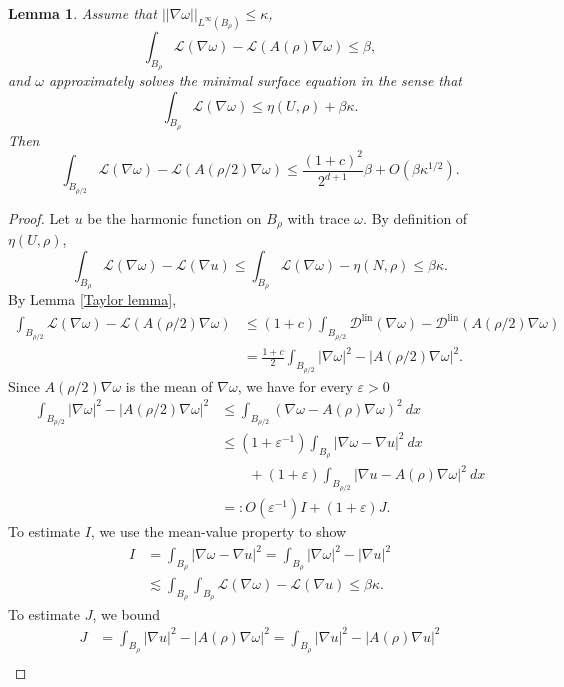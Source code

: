 \documentclass[reqno,12pt,letterpaper]{amsart}
\newcommand{\Lagrange}{\mathscr L}
\newcommand{\DirL}{\mathscr D^{\mathrm{lin}}}
\newtheorem{lemma}[theorem]{Lemma}
\theoremstyle{definition}
\numberwithin{equation}{section}
\begin{document}
\begin{lemma}
Assume that $||\nabla \omega||_{L^\infty(B_\rho)} \leq \kappa$,
$$\int_{B_\rho} \Lagrange(\nabla \omega) - \Lagrange(A(\rho)\nabla \omega) \leq \beta,$$
and $\omega$ approximately solves the minimal surface equation in the sense that
$$\int_{B_\rho} \Lagrange(\nabla \omega) \leq \eta(U, \rho) + \beta \kappa.$$
Then
$$\int_{B_{\rho/2}} \Lagrange(\nabla \omega) - \Lagrange(A(\rho/2)\nabla \omega) \leq \frac{(1 + c)^2}{2^{d + 1}}\beta + O(\beta \kappa^{1/2}).$$
\end{lemma}
\begin{proof}
Let $u$ be the harmonic function on $B_\rho$ with trace $\omega$.
By definition of $\eta(U, \rho)$,
$$\int_{B_\rho} \Lagrange(\nabla \omega) - \Lagrange(\nabla u) \leq \int_{B_\rho} \Lagrange(\nabla \omega) - \eta(N, \rho) \leq \beta\kappa.$$
By Lemma \ref{Taylor lemma},
\begin{align*}
\int_{B_{\rho/2}} \Lagrange(\nabla \omega) - \Lagrange(A(\rho/2)\nabla \omega) &\leq (1 + c)\int_{B_{\rho/2}} \DirL(\nabla \omega) - \DirL(A(\rho/2)\nabla \omega) \\
&= \frac{1 + c}{2} \int_{B_{\rho/2}} |\nabla \omega|^2 - |A(\rho/2)\nabla\omega|^2.
\end{align*}
Since $A(\rho/2)\nabla \omega$ is the mean of $\nabla \omega$, we have for every $\varepsilon > 0$
\begin{align*}
\int_{B_{\rho/2}} |\nabla \omega|^2 - |A(\rho/2)\nabla \omega|^2 &\leq \int_{B_{\rho/2}} (\nabla \omega - A(\rho)\nabla \omega)^2 ~dx \\
&\leq (1 + \varepsilon^{-1})\int_{B_\rho} |\nabla \omega - \nabla u|^2 ~dx\\
&\qquad + (1 + \varepsilon) \int_{B_{\rho/2}} |\nabla u - A(\rho)\nabla \omega|^2 ~dx\\
&=: O(\varepsilon^{-1})I + (1 + \varepsilon)J.
\end{align*}
To estimate $I$, we use the mean-value property to show
\begin{align*}
I &= \int_{B_\rho} |\nabla \omega - \nabla u|^2 = \int_{B_\rho} |\nabla \omega|^2 - |\nabla u|^2 \\
&\lesssim \int_{B_\rho} \int_{B_\rho} \Lagrange(\nabla \omega) - \Lagrange(\nabla u) \leq \beta \kappa.
\end{align*}
To estimate $J$, we bound
\begin{align*}
J &= \int_{B_\rho} |\nabla u|^2 - |A(\rho)\nabla \omega|^2 = \int_{B_\rho} |\nabla u|^2 - |A(\rho)\nabla u|^2 \\

\end{align*}
\end{proof}
\end{document}
